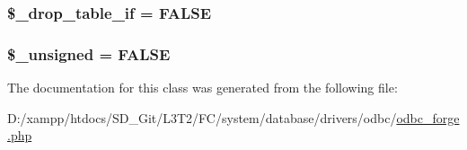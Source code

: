 \subsubsection[{\$\+\_\+drop\+\_\+table\+\_\+if}]{\setlength{\rightskip}{0pt plus 5cm}\$\+\_\+drop\+\_\+table\+\_\+if = F\+A\+L\+S\+E\hspace{0.3cm}{\ttfamily [protected]}}\label{class_c_i___d_b__odbc__forge_a92a8a9145a7fc91e252e58d019373581}
\hypertarget{class_c_i___d_b__odbc__forge_aae977ae6d61fa183f0b25422b6ddc31c}{}
\subsubsection[{\$\+\_\+unsigned}]{\setlength{\rightskip}{0pt plus 5cm}\$\+\_\+unsigned = F\+A\+L\+S\+E\hspace{0.3cm}{\ttfamily [protected]}}\label{class_c_i___d_b__odbc__forge_aae977ae6d61fa183f0b25422b6ddc31c}


The documentation for this class was generated from the following file\+:\begin{DoxyCompactItemize}
\item 
D\+:/xampp/htdocs/\+S\+D\+\_\+\+Git/\+L3\+T2/\+F\+C/system/database/drivers/odbc/\hyperlink{odbc__forge_8php}{odbc\+\_\+forge.\+php}\end{DoxyCompactItemize}

